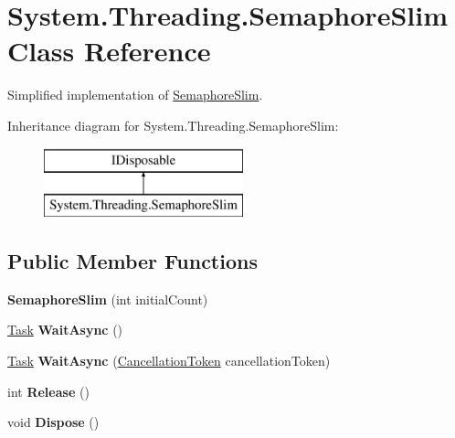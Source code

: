 \hypertarget{class_system_1_1_threading_1_1_semaphore_slim}{}\section{System.\+Threading.\+Semaphore\+Slim Class Reference}
\label{class_system_1_1_threading_1_1_semaphore_slim}


Simplified implementation of \hyperlink{class_system_1_1_threading_1_1_semaphore_slim}{Semaphore\+Slim}.  


Inheritance diagram for System.\+Threading.\+Semaphore\+Slim\+:\begin{figure}[H]
\begin{center}
\leavevmode
\includegraphics[height=2.000000cm]{class_system_1_1_threading_1_1_semaphore_slim}
\end{center}
\end{figure}
\subsection*{Public Member Functions}
\begin{DoxyCompactItemize}
\item 
\mbox{\label{class_system_1_1_threading_1_1_semaphore_slim_a159791eab1acdede5135bfd5befdd6b7}} 
{\bfseries Semaphore\+Slim} (int initial\+Count)
\item 
\mbox{\label{class_system_1_1_threading_1_1_semaphore_slim_a65e8b6755086cbcb88fcdc5758a33a55}} 
\hyperlink{class_system_1_1_threading_1_1_tasks_1_1_task}{Task} {\bfseries Wait\+Async} ()
\item 
\mbox{\label{class_system_1_1_threading_1_1_semaphore_slim_ad029e67589b38d997fea0b301c26ac11}} 
\hyperlink{class_system_1_1_threading_1_1_tasks_1_1_task}{Task} {\bfseries Wait\+Async} (\hyperlink{struct_system_1_1_threading_1_1_cancellation_token}{Cancellation\+Token} cancellation\+Token)
\item 
\mbox{\label{class_system_1_1_threading_1_1_semaphore_slim_a0d5381112bb1ee977c693f4730d38f03}} 
int {\bfseries Release} ()
\item 
\mbox{\label{class_system_1_1_threading_1_1_semaphore_slim_a4ae552cd56b642eeb53c4cfa864663a3}} 
void {\bfseries Dispose} ()
\end{DoxyCompactItemize}
